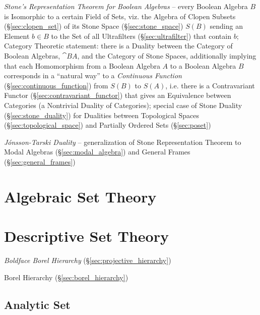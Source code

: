 \emph{Stone's Representation Theorem for Boolean Algebras} -- every Boolean
Algebra $B$ is Isomorphic to a certain Field of Sets, viz. the Algebra of Clopen
Subsets (\S\ref{sec:clopen_set}) of its Stone Space (\S\ref{sec:stone_space})
$\xspace{S}(B)$ sending an Element $b \in B$ to the Set of all Ultrafilters
(\S\ref{sec:ultrafilter}) that contain $b$; Category Theoretic statement: there
is a Duality between the Category of Boolean Algebras, $\cat{BA}$, and the
Category of Stone Spaces, additionally implying that each Homomorphism from a
Boolean Algebra $A$ to a Boolean Algebra $B$ corresponds in a ``natural way'' to
a \emph{Continuous Function} (\S\ref{sec:continuous_function}) from $S(B)$ to
$S(A)$, i.e. there is a Contravariant Functor
(\S\ref{sec:contravariant_functor}) that gives an Equivalence between Categories
(a Nontrivial Duality of Categories); special case of Stone Duality
(\S\ref{sec:stone_duality}) for Dualities between Topological Spaces
(\S\ref{sec:topological_space}) and Partially Ordered Sets (\S\ref{sec:poset})

\fist \emph{J\'onsson-Tarski Duality} --
generalization of Stone Representation Theorem to Modal Algebras
(\S\ref{sec:modal_algebra}) and General Frames (\S\ref{sec:general_frames})



\section{Algebraic Set Theory}\label{sec:algebraic_set_theory}

\section{Descriptive Set Theory}\label{sec:descriptive_set_theory}

\emph{Boldface Borel Hierarchy} (\S\ref{sec:projective_hierarchy})

Borel Hierarchy (\S\ref{sec:borel_hierarchy})



\subsection{Analytic Set}\label{sec:analytic_set}

